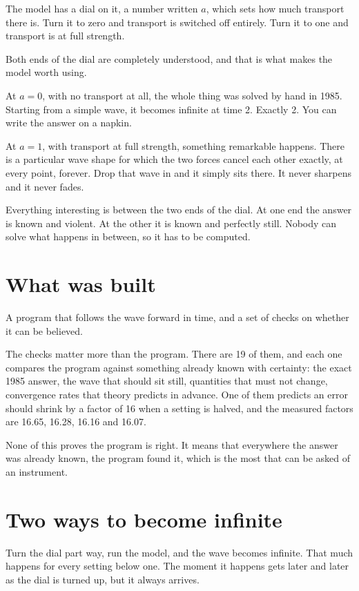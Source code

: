 \documentclass[11pt,a4paper]{article}
\begin{document}
The model has a dial on it, a number written $a$, which sets how much transport
there is. Turn it to zero and transport is switched off entirely. Turn it to
one and transport is at full strength.

Both ends of the dial are completely understood, and that is what makes the
model worth using.

At $a = 0$, with no transport at all, the whole thing was solved by hand in
1985. Starting from a simple wave, it becomes infinite at time 2. Exactly 2.
You can write the answer on a napkin.

At $a = 1$, with transport at full strength, something remarkable happens.
There is a particular wave shape for which the two forces cancel each other
exactly, at every point, forever. Drop that wave in and it simply sits there.
It never sharpens and it never fades.

\begin{keybox}
Everything interesting is between the two ends of the dial. At one end the
answer is known and violent. At the other it is known and perfectly still.
Nobody can solve what happens in between, so it has to be computed.
\end{keybox}

\section{What was built}

A program that follows the wave forward in time, and a set of checks on whether
it can be believed.

The checks matter more than the program. There are 19 of them, and each one
compares the program against something already known with certainty: the exact
1985 answer, the wave that should sit still, quantities that must not change,
convergence rates that theory predicts in advance. One of them predicts an
error should shrink by a factor of 16 when a setting is halved, and the
measured factors are 16.65, 16.28, 16.16 and 16.07.

None of this proves the program is right. It means that everywhere the answer
was already known, the program found it, which is the most that can be asked of
an instrument.

\section{Two ways to become infinite}

Turn the dial part way, run the model, and the wave becomes infinite. That much
happens for every setting below one. The moment it happens gets later and later
as the dial is turned up, but it always arrives.
\end{document}
